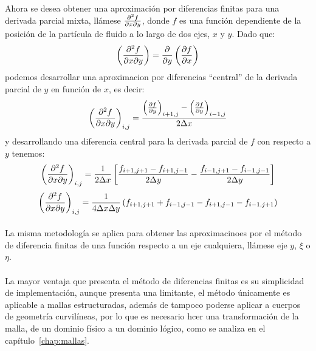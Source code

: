 \documentclass[letterpaper, openright, 12pt]{book}
\begin{document}
    \paragraph*{}
    Ahora se desea obtener una aproximación por diferencias finitas para una
    derivada parcial mixta, llámese $\pdv{f}{x}{y}$, donde $f$ es una función
    dependiente de la posición de la partícula de fluido a lo largo de dos ejes,
    $x$ y $y$. Dado que:
    \begin{equation}
    \left( \pdv{f}{x}{y} \right) = \pdv{y} \left( \pdv{f}{x} \right)
    \end{equation}
    podemos desarrollar una aproximacion por diferencias ``central'' de la
    derivada parcial de $y$ en función de $x$, es decir:
    \begin{equation}
    \left( \pdv{f}{x}{y} \right)_{i,j} = \frac{\left( \pdv{f}{y} \right)_{i+1, j} - \left( \pdv{f}{y} \right)_{i-1,j}}{2 \Delta x}
    \end{equation}
    y desarrollando una diferencia central para la derivada parcial de $f$ con
    respecto a $y$ tenemos:
    \begin{equation}
    \left( \pdv{f}{x}{y} \right)_{i,j} = \frac{1}{2 \Delta x} \left[ \frac{f_{i+1, j+1} - f_{i+1, j-1}}{2 \Delta y} - \frac{f_{i-1, j+1} - f_{i-1, j-1}}{2 \Delta y} \right]
    \end{equation}
    \begin{equation}
    \left( \pdv{f}{x}{y} \right)_{i,j} = \frac{1}{4 \Delta x \Delta y} \left( f_{i+1, j+1} + f_{i-1, j-1} - f_{i+1, j-1} - f_{i-1, j+1} \right)
    \end{equation}

    \paragraph*{}
    La misma metodología se aplica para obtener las aproximacinoes por el método
    de diferencia finitas de una función respecto a un eje cualquiera, llámese
    eje $y$, $\xi$ o $\eta$.

    \paragraph*{}
    La mayor ventaja que presenta el método de diferencias finitas es su
    simplicidad de implementación, aunque presenta una limitante, el método
    únicamente es aplicable a mallas estructuradas, además de tampoco poderse
    aplicar a cuerpos de geometría curvilíneas, por lo que es necesario hcer una
    transformación de la malla, de un dominio físico a un dominio lógico, como
    se analiza en el capítulo~\ref{chap:mallas}.
\end{document}
